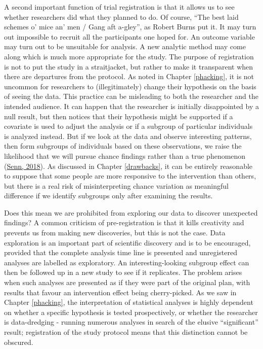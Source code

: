 \documentclass{krantz}
\begin{document}
A second important function of trial registration is that it allows us to see whether researchers did what they planned to do. Of course, ``The best laid schemes o' mice an' men / Gang aft a-gley'', as Robert Burns put it. It may turn out impossible to recruit all the participants one hoped for. An outcome variable may turn out to be unsuitable for analysis. A new analytic method may come along which is much more appropriate for the study. The purpose of registration is not to put the study in a straitjacket, but rather to make it transparent when there are departures from the protocol. As noted in Chapter \ref{phacking}, it is not uncommon for researchers to (illegitimately) change their hypothesis on the basis of seeing the data. This practice can be misleading to both the researcher and the intended audience. It can happen that the researcher is initially disappointed by a null result, but then notices that their hypothesis might be supported if a covariate is used to adjust the analysis or if a subgroup of particular individuals is analyzed instead. But if we look at the data and observe interesting patterns, then form subgroups of individuals based on these observations, we raise the likelihood that we will pursue chance findings rather than a true phenomenon (\protect\hyperlink{ref-senn2018}{Senn, 2018}). As discussed in Chapter \ref{drawbacks}, it can be entirely reasonable to suppose that some people are more responsive to the intervention than others, but there is a real risk of misinterpreting chance variation as meaningful difference if we identify subgroups only after examining the results.

Does this mean we are prohibited from exploring our data to discover unexpected findings? A common criticism of pre-registration is that it kills creativity and prevents us from making new discoveries, but this is not the case. Data exploration is an important part of scientific discovery and is to be encouraged, provided that the complete analysis time line is presented and unregistered analyses are labelled as exploratory. An interesting-looking subgroup effect can then be followed up in a new study to see if it replicates. The problem arises when such analyses are presented as if they were part of the original plan, with results that favour an intervention effect being cherry-picked. As we saw in Chapter \ref{phacking}, the interpretation of statistical analyses is highly dependent on whether a specific hypothesis is tested prospectively, or whether the researcher is data-dredging - running numerous analyses in search of the elusive ``significant'' result; registration of the study protocol means that this distinction cannot be obscured.
\end{document}
